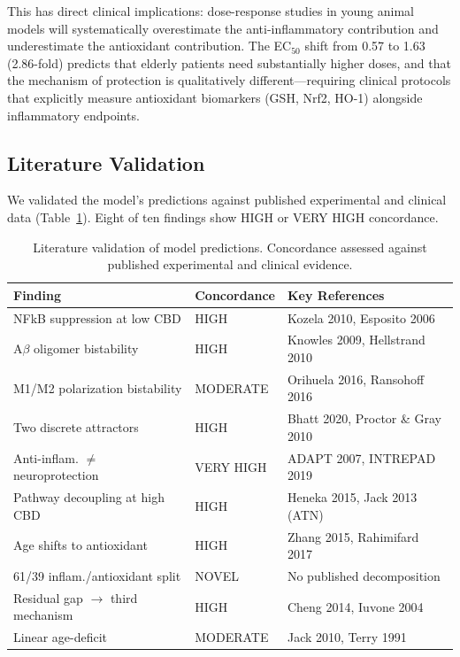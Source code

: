 \documentclass[10pt,letterpaper]{article}
\begin{document}
This has direct clinical implications: dose-response studies in young animal models will systematically overestimate the anti-inflammatory contribution and underestimate the antioxidant contribution. The EC$_{50}$ shift from 0.57 to 1.63 (2.86-fold) predicts that elderly patients need substantially higher doses, and that the mechanism of protection is qualitatively different---requiring clinical protocols that explicitly measure antioxidant biomarkers (GSH, Nrf2, HO-1) alongside inflammatory endpoints.

\subsection{Literature Validation}

We validated the model's predictions against published experimental and clinical data (Table~\ref{tab:literature_validation}). Eight of ten findings show HIGH or VERY HIGH concordance.

\begin{table}[htbp]
\centering
\caption{Literature validation of model predictions. Concordance assessed against published experimental and clinical evidence.}
\label{tab:literature_validation}
\begin{tabular}{p{3.5cm}lp{4cm}}
\toprule
Finding & Concordance & Key References \\
\midrule
NFkB suppression at low CBD & HIGH & Kozela 2010, Esposito 2006 \\
A$\beta$ oligomer bistability & HIGH & Knowles 2009, Hellstrand 2010 \\
M1/M2 polarization bistability & MODERATE & Orihuela 2016, Ransohoff 2016 \\
Two discrete attractors & HIGH & Bhatt 2020, Proctor \& Gray 2010 \\
Anti-inflam. $\neq$ neuroprotection & VERY HIGH & ADAPT 2007, INTREPAD 2019 \\
Pathway decoupling at high CBD & HIGH & Heneka 2015, Jack 2013 (ATN) \\
Age shifts to antioxidant & HIGH & Zhang 2015, Rahimifard 2017 \\
61/39 inflam./antioxidant split & NOVEL & No published decomposition \\
Residual gap $\to$ third mechanism & HIGH & Cheng 2014, Iuvone 2004 \\
Linear age-deficit & MODERATE & Jack 2010, Terry 1991 \\
\bottomrule
\end{tabular}
\end{table}
\end{document}
